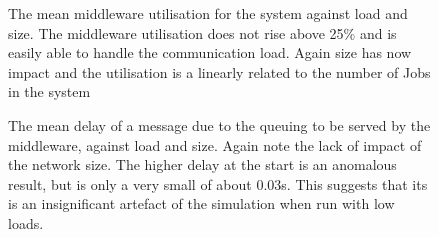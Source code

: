 \begin{figure}[h] 
  \centering

  \caption{The mean middleware utilisation for the system against load and
  size. The middleware utilisation does not rise above 25\% and is easily able
  to handle the communication load. Again size has now impact and the
  utilisation is a linearly related to the number of Jobs in the system}

  \label{FIG:RES:MUTIL}
\end{figure}

\begin{figure}[h] 
  \centering

  \caption{The mean delay of a message due to the queuing to be served by the
  middleware, against load and size.  Again note the lack of impact of the
  network size. The higher delay at the start is an anomalous result, but is
  only a very small of about 0.03s. This suggests that its is an insignificant
  artefact of the simulation when run with low loads.}

  \label{FIG:RES:QDELAY}
\end{figure}


